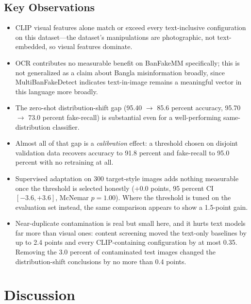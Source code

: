 \documentclass[conference,a4paper]{IEEEtran}
\begin{document}
\subsection{Key Observations}

\begin{itemize}
\item CLIP visual features alone match or exceed every text-inclusive
configuration on this dataset---the dataset's manipulations are photographic,
not text-embedded, so visual features dominate.

\item OCR contributes no measurable benefit on BanFakeMM specifically; this is
not generalized as a claim about Bangla misinformation broadly, since
MultiBanFakeDetect \cite{multibanfake} indicates text-in-image remains a
meaningful vector in this language more broadly.

\item The zero-shot distribution-shift gap (95.40 $\rightarrow$ 85.6 percent
accuracy, 95.70 $\rightarrow$ 73.0 percent fake-recall) is substantial even
for a well-performing same-distribution classifier.

\item Almost all of that gap is a \emph{calibration} effect: a threshold
chosen on disjoint validation data recovers accuracy to 91.8 percent and
fake-recall to 95.0 percent with no retraining at all.

\item Supervised adaptation on 300 target-style images adds nothing measurable
once the threshold is selected honestly ($+0.0$ points, 95 percent CI
$[-3.6, +3.6]$, McNemar $p = 1.00$). Where the threshold is tuned on the
evaluation set instead, the same comparison appears to show a 1.5-point gain.

\item Near-duplicate contamination is real but small here, and it hurts text
models far more than visual ones: content screening moved the text-only
baselines by up to 2.4 points and every CLIP-containing configuration by at
most 0.35. Removing the 3.0 percent of contaminated test images changed the
distribution-shift conclusions by no more than 0.4 points.
\end{itemize}

\section{Discussion}
\end{document}
